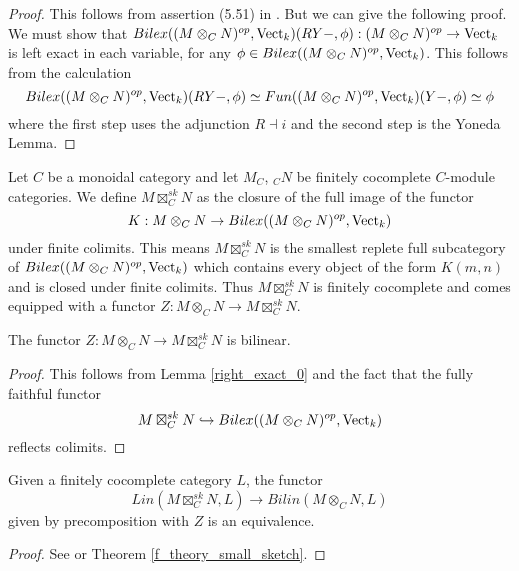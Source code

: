 \begin{proof}

  This follows from assertion (5.51) in \cite{kelly/basic-concepts-enriched}.
  But we can give the following proof. We must show that $Bilex((M\otimes_C
  N)^{op},\operatorname{Vect}_k)(RY-,\phi):(M\otimes_C N)^{op}\to\operatorname{Vect}_k$ is left exact in
  each variable, for any $\phi\in Bilex((M\otimes_C N)^{op},\operatorname{Vect}_k)$. This
  follows from the calculation $$Bilex((M\otimes_C
  N)^{op},\operatorname{Vect}_k)(RY-,\phi)\simeq Fun((M\otimes_C
  N)^{op},\operatorname{Vect}_k)(Y-,\phi)\simeq \phi$$ where the first step uses the
  adjunction $R\dashv i$ and the second step is the Yoneda Lemma.
\end{proof}

\begin{definition}\label{sk_nonsemisimple}

  \noindent Let $C$ be a monoidal category and let $M_C$, $_{C}N$ be finitely
  cocomplete $C$-module categories. We define $M\boxtimes_C^{sk}N$ as the
  closure of the full image of the functor $$K:M\otimes_C N \to
  Bilex((M\otimes_C N)^{op},\operatorname{Vect}_k)$$ under finite colimits. This means
  $M\boxtimes_C^{sk}N$ is the smallest replete full subcategory of
  $Bilex((M\otimes_C N)^{op},\operatorname{Vect}_k)$ which contains every object of the form
  $K(m,n)$ and is closed under finite colimits. Thus $M\boxtimes_C^{sk}N$ is
  finitely cocomplete and comes equipped with a functor $Z:M\otimes_C N \to
  M\boxtimes_C^{sk}N$.
\end{definition}

\begin{lemma}\label{right_exact}
  The functor $Z:M\otimes_C N \to M\boxtimes_C^{sk}N$ is bilinear.
\end{lemma}

\begin{proof}
  This follows from Lemma \ref{right_exact_0} and the fact that the fully
  faithful functor $$M\boxtimes_C^{sk}N\hookrightarrow Bilex((M\otimes_C
  N)^{op},\operatorname{Vect}_k)$$ reflects colimits.
\end{proof}

\begin{proposition}\label{univ_sk_nonsemisimple}

  \noindent Given a finitely cocomplete category $L$, the
  functor $$Lin(M\boxtimes_C^{sk}N,L)\to Bilin(M\otimes_C N, L)$$ given by
  precomposition with $Z$ is an equivalence.
\end{proposition}

\begin{proof}
  See \cite[Theorem 6.23]{kelly/basic-concepts-enriched} or Theorem
  \ref{f_theory_small_sketch}.
\end{proof}

